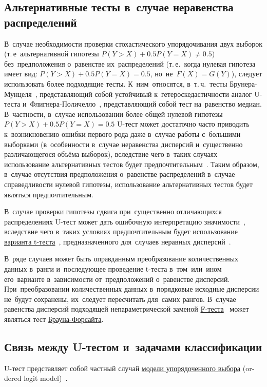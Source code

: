 \documentclass[]{scrreprt}
\begin{document}
\subsection{Альтернативные тесты в~случае неравенства распределений}
В~случае необходимости проверки стохастического упорядочивания двух выборок (т.\,е~альтернативной гипотезы $P(Y>X)+0.5P(Y=X)\neq0.5$) без~предположения о~равенстве их~распределений (т.\,е.~когда нулевая гипотеза имеет вид: $P(Y>X)+0.5P(Y=X)=0.5$, но~не~$F(X)=G(Y)$), следует использовать более подходящие тесты. К~ним~относятся, в~т.\,ч.~тесты Брунера-Мунцеля~\cite{Bruner-Munzel-test}, представляющий собой устойчивый к~гетероскедастичности аналог U-теста и~Флигнера-Поличелло~\cite{Fligner-Policello-test}, представляющий собой тест на~равенство медиан. В~частности, в~случае использовании более общей нулевой гипотезы $P(Y>X)+0.5P(Y=X)=0.5$ U-тест может достаточно часто приводить к~возникновению ошибки первого рода даже в~случае работы с~большими выборками (в~особенности в~случае неравенства дисперсий и~существенно различающегося объёма выборок), вследствие чего в~таких случаях использование альтернативных тестов будет предпочтительным~\cite{U-test-vs-Bruner-Munzel-test}. Таким образом, в~случае отсутствия предположения о~равенстве распределений в~случае справедливости нулевой гипотезы, использование альтернативных тестов будет являться предпочтительным.

В~случае проверки гипотезы сдвига при~существенно отличающихся распределениях U-тест может дать ошибочную интерпретацию значимости~\cite{U-test-unequal-variance}, вследствие чего в~таких условиях предпочтительным будет использование \href{https://en.wikipedia.org/wiki/Welch's_t-test}{варианта t-теста}~\cite{Welch-t-test}, предназначенного для~случаев неравных дисперсий~\cite{U-test-unequal-variance}.

В~ряде случаев может быть оправданным преобразование количественных данных в~ранги и~последующее проведение t-теста в~том~или~ином его~варианте в~зависимости от~предположений о~равенстве дисперсий. При~преобразовании количественных данных в~порядковые исходные дисперсии не~будут сохранены, их~следует пересчитать для~самих рангов. В~случае равенства дисперсий подходящей непараметрической заменой \href{https://en.wikipedia.org/wiki/F-test}{F-теста}~\cite{F-test} может являться тест \href{https://en.wikipedia.org/wiki/Brown-Forsythe_test}{Брауна-Форсайта}.
%
\subsection{Связь между U-тестом и~задачами классификации}\label{U-test&classification}
U-тест представляет собой частный случай \href{https://en.wikipedia.org/wiki/Ordered_logit}{модели упорядоченного выбора} (\foreignlanguage{english}{ordered logit model})~\cite{Ordered-logit}.
%
\end{document}
